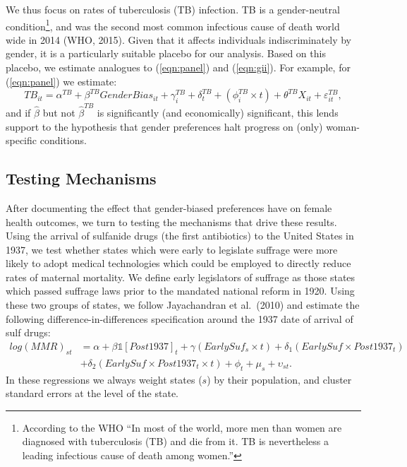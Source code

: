 \documentclass[11pt]{article}
\begin{document}
\begin{spacing}{1.4}
We thus focus on rates of tuberculosis (TB) infection.  TB is a gender-neutral
condition\footnote{According to the WHO ``In most of the world, more men than 
women are diagnosed with tuberculosis (TB) and die from it. TB is nevertheless 
a leading infectious cause of death among women.''}, %
 and was the second most common infectious cause of death world wide in 2014 
(WHO, 2015). %
Given that it affects individuals indiscriminately by gender, it is a
 particularly suitable placebo for our analysis.  Based on this placebo, we 
estimate analogues to (\ref{eqn:panel}) and (\ref{eqn:gii}).  For example, for 
(\ref{eqn:panel}) we estimate:
\begin{equation}
TB_{it} = \alpha^{TB} + \beta^{TB} GenderBias_{it} + \gamma^{TB}_i + \delta^{TB}_t + 
               (\phi^{TB}_i\times t) + \theta^{TB} X_{it} + \varepsilon^{TB}_{it},
\end{equation}
and if $\hat\beta$ but not $\hat\beta^{TB}$ is significantly (and economically)
significant, this lends support to the hypothesis that gender preferences halt
progress on (only) woman-specific conditions.


\subsection{Testing Mechanisms}
After documenting the effect that gender-biased preferences have on female
health outcomes, we turn to testing the mechanisms that drive these results.
Using the arrival of sulfanide drugs (the first antibiotics) to the United 
States in 1937, we test whether states which were early to legislate suffrage 
were more likely to adopt medical technologies which could be employed to 
directly reduce rates of maternal mortality. We define early legislators of 
suffrage as those states which passed suffrage laws prior to the mandated 
national reform in 1920.  Using these two groups of states, we follow 
Jayachandran et al.\ (2010) and estimate the following difference-in-differences 
specification around the 1937 date of arrival of sulf drugs:
\begin{eqnarray}
\label{eqn:sulfa}
log(MMR)_{st} & = \alpha + \beta \mathds{1}[Post1937]_t + \gamma(EarlySuf_{s}\times t)
                + \delta_1 (EarlySuf\times Post1937_t) \nonumber \\
              & + \delta_2 (EarlySuf\times Post1937_t\times t) + \phi_t + \mu_s
                + \upsilon_{st}.
\end{eqnarray}
In these regressions we always weight states ($s$) by their population, and 
cluster standard errors at the level of the state.


\end{spacing}
\end{document}
